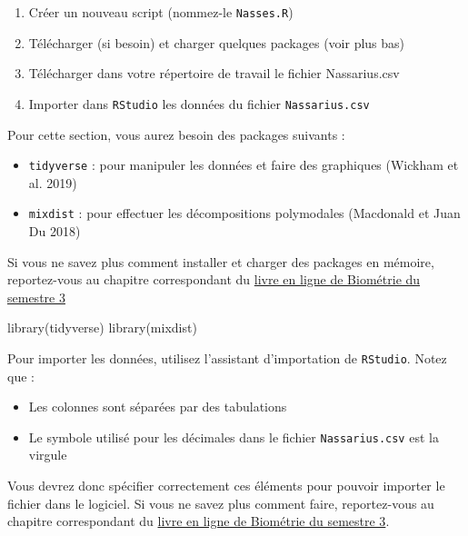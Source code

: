 \documentclass[
  french,
  a4paper,
  DIV=11,
  numbers=noendperiod,
  oneside]{scrreprt}
\newenvironment{Shaded}{}{}
\newcommand{\FunctionTok}[1]{\textcolor[rgb]{0.44,0.26,0.76}{#1}}
\newcommand{\NormalTok}[1]{\textcolor[rgb]{0.14,0.16,0.18}{#1}}
\providecommand{\tightlist}{%
  \setlength{\itemsep}{0pt}\setlength{\parskip}{0pt}}
\begin{document}
\begin{tcolorbox}
\begin{enumerate}
\def\labelenumi{\arabic{enumi}.}
\tightlist
\item
  Créer un nouveau script (nommez-le \texttt{Nasses.R})
\item
  Télécharger (si besoin) et charger quelques packages (voir plus bas)
\item
  Télécharger dans votre répertoire de travail le fichier Nassarius.csv
\item
  Importer dans \texttt{RStudio} les données du fichier
  \texttt{Nassarius.csv}
\end{enumerate}

Pour cette section, vous aurez besoin des packages suivants :

\begin{itemize}
\tightlist
\item
  \texttt{tidyverse} : pour manipuler les données et faire des
  graphiques (Wickham et al. 2019)
\item
  \texttt{mixdist} : pour effectuer les décompositions polymodales
  (Macdonald et Juan Du 2018)
\end{itemize}

Si vous ne savez plus comment installer et charger des packages en
mémoire, reportez-vous au chapitre correspondant du
\href{https://besibo.github.io/BiometrieS3/01-R-basics.html\#sec-packages}{livre
en ligne de Biométrie du semestre 3}

\begin{Shaded}
\begin{Highlighting}[]
\FunctionTok{library}\NormalTok{(tidyverse)}
\FunctionTok{library}\NormalTok{(mixdist)}
\end{Highlighting}
\end{Shaded}

Pour importer les données, utilisez l'assistant d'importation de
\texttt{RStudio}. Notez que :

\begin{itemize}
\tightlist
\item
  Les colonnes sont séparées par des tabulations
\item
  Le symbole utilisé pour les décimales dans le fichier
  \texttt{Nassarius.csv} est la virgule
\end{itemize}

Vous devrez donc spécifier correctement ces éléments pour pouvoir
importer le fichier dans le logiciel. Si vous ne savez plus comment
faire, reportez-vous au chapitre correspondant du
\href{https://besibo.github.io/BiometrieS3/04-DataWrangling.html\#plaintext}{livre
en ligne de Biométrie du semestre 3}.


\end{tcolorbox}
\end{document}
